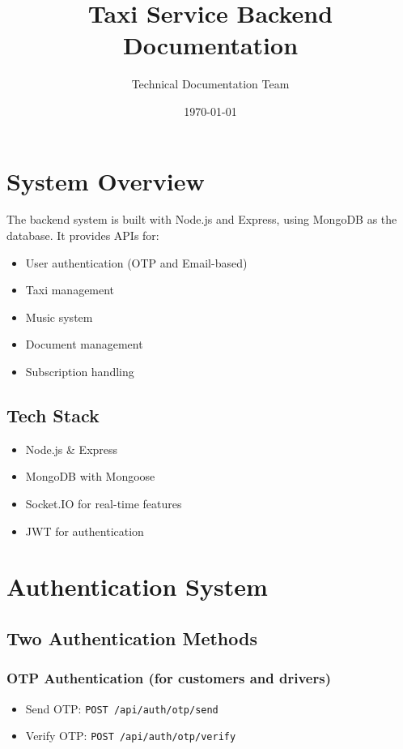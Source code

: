 \documentclass[11pt,a4paper]{article}
\begin{document}
\title{\textbf{Taxi Service Backend Documentation}}
\author{Technical Documentation Team}
\date{\today}

\maketitle
\tableofcontents
\newpage

\section{System Overview}
The backend system is built with Node.js and Express, using MongoDB as the database. It provides APIs for:
\begin{itemize}
    \item User authentication (OTP and Email-based)
    \item Taxi management
    \item Music system
    \item Document management
    \item Subscription handling
\end{itemize}

\subsection{Tech Stack}
\begin{itemize}
    \item Node.js \& Express
    \item MongoDB with Mongoose
    \item Socket.IO for real-time features
    \item JWT for authentication
\end{itemize}

\section{Authentication System}
\subsection{Two Authentication Methods}

\subsubsection{OTP Authentication (for customers and drivers)}
\begin{itemize}
    \item Send OTP: \texttt{POST /api/auth/otp/send}
    \item Verify OTP: \texttt{POST /api/auth/otp/verify}
\end{itemize}
\end{document}
